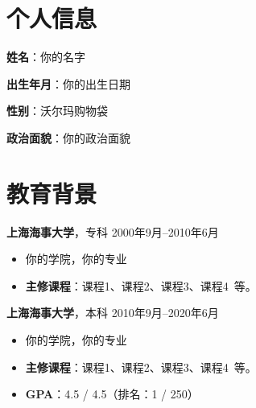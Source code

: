 \documentclass[11pt]{article}
\newlength{\iconwidth}
\begin{document}
    \begin{minipage}[t]{0.78\textwidth}
        \begin{minipage}[t]{\textwidth}
        \section[个人信息]{\quad 个人信息}
        \begin{minipage}[t]{0.5\textwidth}
            \textbf{姓\qquad 名}：你的名字
            
            \vspace{0.5em}
            \textbf{出生年月}：你的出生日期
        \end{minipage}
        \begin{minipage}[t]{0.35\textwidth}
            \textbf{性\qquad 别}：沃尔玛购物袋
            
            \vspace{0.5em}
            \textbf{政治面貌}：你的政治面貌
        \end{minipage}
        \vspace{1.2em}
        \end{minipage}

        \begin{minipage}[t]{\textwidth}
        \section[教育背景]{\quad 教育背景}
        
        {\large \textbf{上海海事大学}}，专科 \hfill 2000年9月--2010年6月
        \begin{itemize}
            \item 你的学院，你的专业
            \item \textbf{主修课程}：课程1、课程2、课程3、课程4\ 等。
        \end{itemize}
        
        \vspace{0.5em}
        {\large \textbf{上海海事大学}}，本科 \hfill 2010年9月--2020年6月
        \begin{itemize}
            \item 你的学院，你的专业
            \item \textbf{主修课程}：课程1、课程2、课程3、课程4\ 等。
            \item \textbf{GPA}：4.5 / 4.5（排名：1 / 250）
        \end{itemize}
        

\end{minipage}
\end{minipage}
\end{document}
